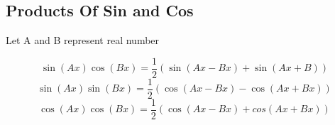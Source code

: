 	\subsection{Products Of Sin and Cos}
	\begin{center}
	Let A and B represent real number
	\end{center}
	\begin{equation}
	\sin{(Ax)}\cos{(Bx)}=\frac{1}{2} \left( \sin{(Ax-Bx)}+\sin{(Ax+B)}\right)
	\end{equation}
	\begin{equation}
	\sin{(Ax)}\sin{(Bx)}=\frac{1}{2}(\cos{(Ax-Bx)}-\cos{(Ax+Bx)})
	\end{equation}
	\begin{equation}
	\cos{(Ax)}\cos{(Bx)}=\frac{1}{2}(\cos{(Ax-Bx)}+cos{(Ax+Bx)})
	\end{equation}
	
